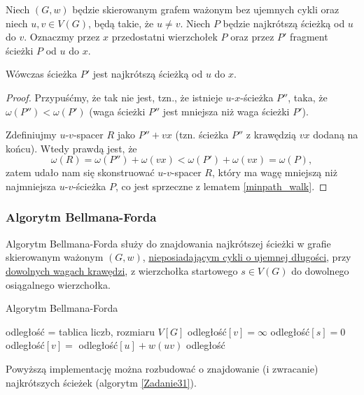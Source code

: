 \begin{lemma}
	Niech $(G, w)$ będzie skierowanym grafem ważonym
	bez ujemnych cykli oraz niech $u, v \in V(G)$,
	będą takie, że $u \not = v$. Niech $P$ będzie
	najkrótszą ścieżką od $u$ do $v$. Oznaczmy przez
	$x$ przedostatni wierzchołek $P$ oraz 
	przez $P'$ fragment ścieżki $P$ od $u$ do $x$.
	
	Wówczas ścieżka $P'$ jest najkrótszą ścieżką od $u$ do 
	$x$.
	
	\begin{proof}
		Przypuśćmy, że tak nie jest, tzn., że istnieje 
		$u$-$x$-ścieżka $P''$, taka, że 
		$\omega(P'') < \omega(P')$ (waga ścieżki $P''$
		jest mniejsza niż waga ścieżki $P'$).
		
		Zdefiniujmy $u$-$v$-spacer $R$ jako $P'' + vx$
		(tzn. ścieżka $P''$ z krawędzią $vx$ 
		dodaną na końcu). Wtedy prawdą jest, że
		\[\omega(R) = \omega(P'') + \omega(vx) <
		\omega(P') + \omega(vx) = \omega(P),\]
		zatem udało nam się skonstruować 
		$u$-$v$-spacer $R$, który ma wagę mniejszą niż
		najmniejsza $u$-$v$-ścieżka $P$, co 
		jest sprzeczne z lematem \ref{minpath_walk}.
	\end{proof}
	\label{minpath_subpath}
\end{lemma}
\subsubsection{Algorytm Bellmana-Forda}
Algorytm Bellmana-Forda służy do znajdowania 
najkrótszej ścieżki w grafie skierowanym ważonym $(G, w)$,
\ul{nieposiadającym cykli o ujemnej długości}, przy 
\ul{dowolnych wagach krawędzi}, %
z wierzchołka startowego $s \in V(G)$
do dowolnego osiągalnego wierzchołka.

\begin{algorithm}[H]
	\caption{Algorytm Bellmana-Forda}\label{bellmanford_alg}
	\begin{algorithmic}[1]
		\State odległość = tablica liczb, rozmiaru $V[G]$
		\State odległość$[v]=\infty$
		\EndFor
		\State odległość$[s]=0$
		\State odległość$[v]=$ odległość$[u] + w(uv)$ 
		\EndIf
		\EndFor
		\EndFor
		\State \Return odległość
		\EndProcedure
	\end{algorithmic}
	\label{bellman_ford}
\end{algorithm}
Powyższą implementację można rozbudować o
znajdowanie (i zwracanie) najkrótszych ścieżek
(algorytm \ref{Zadanie31}).


